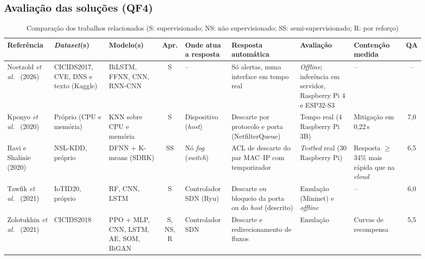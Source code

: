 \documentclass[conference,a4paper]{IEEEtran}
\newcommand{\nao}{--}            %
\begin{document}
\subsection{Avaliação das soluções (QF4)}\label{sec:qf4}
\begin{table}[!b]
\caption{Comparação dos trabalhos relacionados (S: supervisionado; NS: não supervisionado; SS: semi-supervisionado; R: por reforço)}\label{tab:comparacao}
\centering\scriptsize
\setlength{\tabcolsep}{2.5pt}
\renewcommand{\arraystretch}{0.97}
\begin{tabular}{@{}>{\raggedright\arraybackslash}p{}>{\raggedright\arraybackslash}p{}>{\raggedright\arraybackslash}p{}c>{\raggedright\arraybackslash}p{}>{\raggedright\arraybackslash}p{}>{\raggedright\arraybackslash}p{}>{\raggedright\arraybackslash}p{}c@{}}
\toprule
Referência & \textit{Dataset}(s) & Modelo(s) & Apr. & Onde atua a resposta & Resposta automática & Avaliação & Contenção medida & QA \\
\midrule
Noetzold \textit{et al.}~\cite{noetzold2026anomaly} (2026) & CICIDS2017, CVE, DNS e texto (Kaggle) & BiLSTM, FFNN, CNN, RNN-CNN & S & -- & Só alertas, numa interface em tempo real & \textit{Offline}; inferência em servidor, Raspberry Pi 4 e ESP32-S3 & \nao & -- \\
\midrule
Kponyo \textit{et al.}~\cite{kponyo2020lightweight} (2020) & Próprio (CPU e memória) & KNN sobre CPU e memória & S & Dispositivo (\textit{host}) & Descarte por protocolo e porta (NetfilterQueue) & Tempo real (4 Raspberry Pi 3B) & Mitigação em 0,22\,s & 7,0 \\
Ravi e Shalinie~\cite{ravi2020semisupervised} (2020) & NSL-KDD, próprio & DFNN + K-means (SDRK) & SS & Nó \textit{fog} (\textit{switch}) & ACL de descarte do par MAC--IP com temporizador & \textit{Testbed} real (30 Raspberry Pi) & Resposta $\ge$34\% mais rápida que na \textit{cloud} & 6,5 \\
Tawfik \textit{et al.}~\cite{tawfik2021internet} (2021) & IoTID20, próprio & RF, CNN, LSTM & S & Controlador SDN (Ryu) & Descarte ou bloqueio da porta ou do \textit{host} (descrito) & Emulação (Mininet) e \textit{offline} & \nao & 6,0 \\
Zolotukhin \textit{et al.}~\cite{zolotukhin2021curious} (2021) & CICIDS2018 & PPO + MLP, CNN, LSTM, AE, SOM, BiGAN & S, NS, R & Controlador SDN & Descarte e redirecionamento de fluxos & Emulação & Curvas de recompensa & 5,5 \\

\end{tabular}
\end{table}
\end{document}

